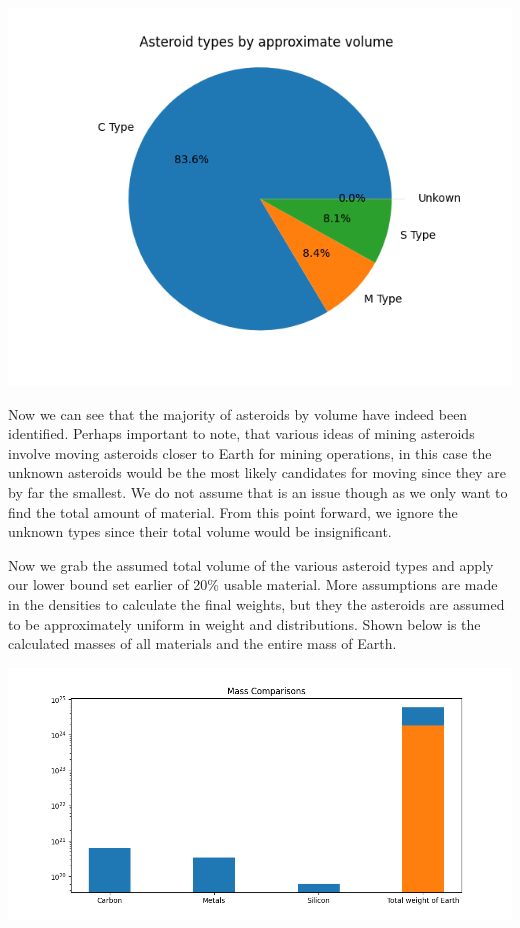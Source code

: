 \documentclass[12pt]{report}
\begin{document}
\begin{center}
	\includegraphics[scale=0.6]{"charts/approx_vol.png"}
\end{center}

\;\;\;\; Now we can see that the majority of asteroids by volume have indeed been identified. Perhaps important to note, that various ideas of mining asteroids involve moving asteroids closer to Earth for mining operations, in this case the unknown asteroids would be the most likely candidates for moving since they are by far the smallest. We do not assume that is an issue though as we only want to find the total amount of material. From this point forward, we ignore the unknown types since their total volume would be insignificant. 

\;\;\;\; Now we grab the assumed total volume of the various asteroid types and apply our lower bound set earlier of 20\% usable material. More assumptions are made in the densities to calculate the final weights, but they the asteroids are assumed to be approximately uniform in weight and distributions. Shown below is the calculated masses of all materials and the entire mass of Earth.

\includegraphics[scale=0.7]{"charts/mass.png"}
\end{document}

